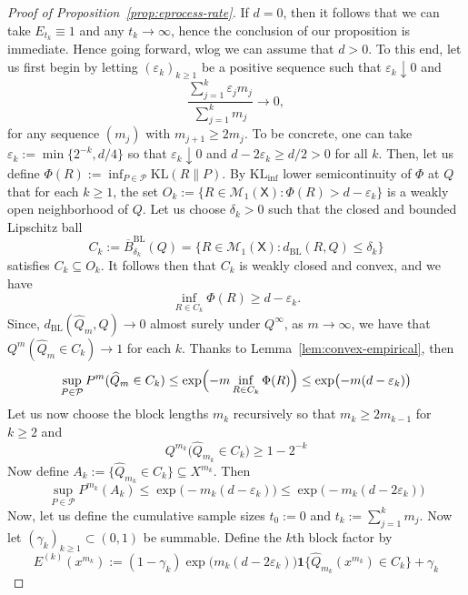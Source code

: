 \documentclass[10pt,a4paper]{amsart}
\newcommand{\KL}{\mathrm{KL}}
\newcommand{\KLinf}{\mathrm{KL}_{\mathrm{inf}}}
\newcommand{\Pcal}{\mathcal{P}}
\newcommand{\X}{\mathsf{X}}
\begin{document}
\begin{proof}[Proof of Proposition~\ref{prop:eprocess-rate}]
If $d=0$, then it follows that we can take $E_{t_k}\equiv 1$ and any $t_k\to\infty$, hence the conclusion of our proposition is immediate. Hence going forward, wlog we can assume that $d>0$. To this end, let us first begin by letting $(\varepsilon_k)_{k\ge 1}$ be a positive sequence such that $\varepsilon_k\downarrow 0$ and
\[
\frac{\sum_{j=1}^k\varepsilon_j m_j}{\sum_{j=1}^k m_j}\longrightarrow 0,
\]
for any sequence $(m_j)$ with $m_{j+1}\ge 2m_j$. To be concrete, one can take $\varepsilon_k:=\min\{2^{-k}, d/4\}$ so that $\varepsilon_k\downarrow 0$ and $d-2\varepsilon_k\ge d/2>0$ for all $k$. Then, let us define $\Phi(R):=\inf_{P\in\Pcal}\KL(R\|P)$. By $\KLinf$ lower semicontinuity of $\Phi$ at $Q$ that for each $k\ge 1$, the set $O_k:=\{R\in\mathcal M_1(\X):\Phi(R)>d-\varepsilon_k\}$ is a weakly open neighborhood of $Q$. Let us choose $\delta_k>0$ such that the closed and bounded Lipschitz ball
\[
C_k:=\overline B^{\mathrm{BL}}_{\delta_k}(Q)=\{R\in\mathcal M_1(\X):d_{\mathrm{BL}}(R,Q)\le\delta_k\}
\]
satisfies $C_k\subseteq O_k$. It follows then that $C_k$ is weakly closed and convex, and we have 
\[
\inf_{R\in C_k}\Phi(R)\ge d-\varepsilon_k.
\]
Since, $d_{\mathrm{BL}}(\widehat Q_m, Q)\to 0$ almost surely under $Q^{\infty}$, as $m\to\infty$, we have that $Q^m(\widehat Q_m\in C_k)\to 1$ for each $k$. Thanks to Lemma~\ref{lem:convex-empirical}, then
\[
\sup_{P\in\Pcal} P^m(\widehat Q_m\in C_k) \le \exp\Bigl(-m\inf_{R\in C_k}\Phi(R)\Bigr) \le \exp\bigl(-m(d-\varepsilon_k)\bigr)
\]
Let us now choose the block lengths $m_k$ recursively so that $m_k\ge 2m_{k-1}$ for $k\ge 2$ and
\begin{equation}\label{eq:eproc-Qgood}
Q^{m_k}\bigl(\widehat Q_{m_k}\in C_k\bigr)\ge 1-2^{-k}    
\end{equation}
Now define $A_k:=\{\widehat Q_{m_k}\in C_k\}\subseteq X^{m_k}$. Then
\begin{equation}\label{eq:eproc-betabound}
\sup_{P\in\Pcal}P^{m_k}(A_k) \le \exp\bigl(-m_k(d-\varepsilon_k)\bigr) \le \exp\bigl(-m_k(d-2\varepsilon_k)\bigr)   
\end{equation}
Now, let us define the cumulative sample sizes $t_0:=0$ and $t_k:=\sum_{j=1}^k m_j$. Now let $(\gamma_k)_{k\ge 1}\subset(0,1)$ be summable. Define the $k$th block factor by
\begin{equation}\label{eq:eproc-blockE}
E^{(k)}(x^{m_k}):=(1-\gamma_k)\exp\bigl(m_k(d-2\varepsilon_k)\bigr)\mathbf 1\!\{\widehat Q_{m_k}(x^{m_k})\in C_k\} +\gamma_k    
\end{equation}


\end{proof}
\end{document}
